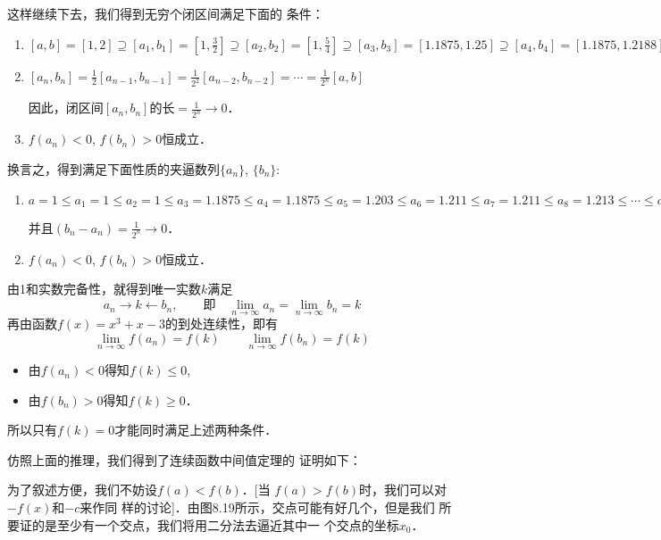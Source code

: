 这样继续下去，我们得到无穷个闭区间满足下面的
条件：
\begin{enumerate}
    \item $[a,b]=[1,2]\supseteq [a_1,b_1]=\left[1,\frac{3}{2}\right]\supseteq [a_2,b_2]=\left[1,\frac{5}{4}\right]\supseteq [a_3,b_3]=\left[1.1875,1.25\right]
    \supseteq [a_4,b_4]=\left[1.1875,1.2188\right]\supseteq [a_5,b_5]=\left[1.203,1.2188\right]\supseteq [a_6,b_6]=\left[1.211,1.2188\right]\supseteq [a_7,b_7]=\left[1.211,1.215\right]\supseteq [a_8,b_8]=\left[1.213,1.215\right]\supseteq   \cdots 
    \supseteq  
    [a_n,b_n]=\supseteq\cdots $
    \item $[a_n,b_n]=\frac{1}{2}[a_{n-1},b_{n-1}]=\frac{1}{2^2}[a_{n-2},b_{n-2}]=\cdots=\frac{1}{2^n}[a,b]$
    
    因此，闭区间$[a_n,b_n]$的长$=\frac{1}{2^n}\to 0$．
    \item $f(a_n)<0$,\; $f(b_n)>0$恒成立．
\end{enumerate}

换言之，得到满足下面性质的夹逼数列$\{a_n\}$, $\{b_n\}$:
\begin{enumerate}
    \item $a=1\le a_1=1\le a_2=1\le a_3=1.1875\le a_4=1.1875  \le  a_5=1.203  \le  a_6=1.211  \le  a_7=1.211  \le  a_8=1.213  \le\cdots\le a_n\le\cdots\le b_n\le \cdots \le  b_8=1.215  \le  b_7=1.215  \le  b_6=1.2188  \le  b_5=1.2188   \le  b_4= 1.2188  \le  b_3= 1.25 \le  b_2=1.25  \le  b_1=1.5  \le  b=2$
    
    并且$(b_n-a_n)=\frac{1}{2^n}\to 0$．

\item $f(a_n)<0$,\; $f(b_n)>0$恒成立．
\end{enumerate}

由1和实数完备性，就得到唯一实数$k$满足
\[a_n\to k\leftarrow b_n,\qquad \text{即}\quad \lim_{n\to\infty} a_n=\lim_{n\to\infty}  b_n=k\]
再由函数$f(x)=x^3+x-3$的到处连续性，即有
\[\lim_{n\to\infty}  f(a_n)=f(k) \qquad  \lim_{n\to\infty}  f(b_n)=f(k)\]
\begin{itemize}
    \item 由$f(a_n)<0$得知$f(k)\le 0$,
    \item 由$f(b_n)>0$得知$f(k)\ge 0$．
\end{itemize}
所以只有$f(k)=0$才能同时满足上述两种条件．

仿照上面的推理，我们得到了连续函数中间值定理的
证明如下：

为了叙述方便，我们不妨设$f(a)<f(b)$．[当
$f(a)>f(b)$时，我们可以对$-f(x)$和$-c$来作同
样的讨论]．由图8.19所示，交点可能有好几个，但是我们
所要证的是至少有一个交点，我们将用二分法去逼近其中一
个交点的坐标$x_0$．

